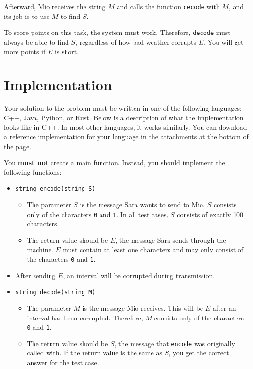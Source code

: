 Afterward, Mio receives the string $M$ and calls the function \texttt{decode} with $M$, 
and its job is to use $M$ to find $S$.

To score points on this task, the system must work. Therefore, \texttt{decode} must always be able 
to find $S$, regardless of how bad weather corrupts $E$. You will get more points if $E$ is short.

\section*{Implementation}
Your solution to the problem must be written in one of the following languages: C++, Java, Python, or Rust.
Below is a description of what the implementation looks like in C++. In most other languages, it works similarly. 
You can download a reference implementation for your language in the attachments at the bottom of the page.

You \textbf{must not} create a main function. Instead, you should implement the following functions:\\

\begin{itemize}
  \item \texttt{string encode(string S)}\\
  \begin{itemize}
    \item The parameter $S$ is the message Sara wants to send to Mio. $S$ consists only of the characters 
    \texttt{0} and \texttt{1}. In all test cases, $S$ consists of exactly 100 characters.
    \item The return value should be $E$, the message Sara sends through the machine. $E$ must contain at 
    least one characters and may only consist of the characters \texttt{0} and \texttt{1}.
  \end{itemize}

  \item After sending $E$, an interval will be corrupted during transmission.

  \item \texttt{string decode(string M)}\\
  \begin{itemize}
    \item The parameter $M$ is the message Mio receives. This will be $E$ after an interval has been corrupted. 
    Therefore, $M$ consists only of the characters \texttt{0} and \texttt{1}.
    \item The return value should be $S$, the message that \texttt{encode} was originally called with. 
    If the return value is the same as $S$, you get the correct answer for the test case.
  \end{itemize}
\end{itemize}

